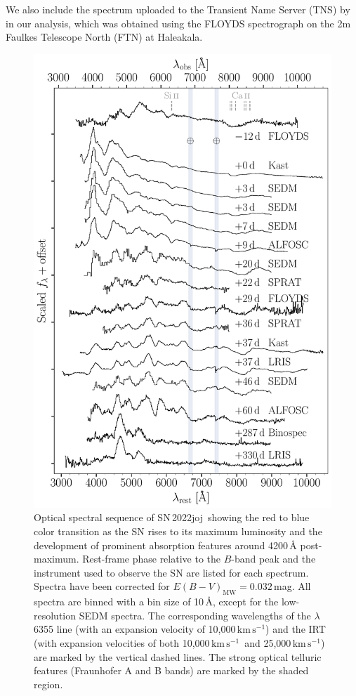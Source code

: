 \documentclass[twocolumn]{aastex631}
\newcommand{\sn}{SN\,2022joj}
\newcommand{\kms}{$\mathrm{km}\,\mathrm{s}^{-1}$}
\begin{document}
\begin{CJK*}{UTF8}{gbsn}
We also include the spectrum uploaded to the Transient Name Server (TNS) by \citet{Newsome_2022TNSCR} in our analysis, which was obtained using the FLOYDS spectrograph on the 2m Faulkes Telescope North (FTN) at Haleakala.

\begin{figure}
    \centering
    \includegraphics[width=\linewidth]{SN2022joj_spectral_sequence.pdf}
    \caption{Optical spectral sequence of \sn\ showing the red to blue color transition as the SN rises to its maximum luminosity and the development of prominent absorption features around 4200\,\r{A} post-maximum.
    Rest-frame phase relative to the $B$-band peak and the instrument used to observe the SN are listed for each spectrum. Spectra have been corrected for ${E(B-V)_\mathrm{MW}} = 0.032$\,mag. All spectra are binned with a bin size of 10\,\AA, except for the low-resolution SEDM spectra. The corresponding wavelengths of the  $\lambda$6355 line (with an expansion velocity of 10,000\,\kms) and the  IRT (with expansion velocities of both 10,000\,\kms\ and 25,000\,\kms) are marked by the vertical dashed lines. The strong optical telluric features (Fraunhofer A and B bands) are marked by the shaded region.}

\end{figure}
\end{CJK*}
\end{document}
